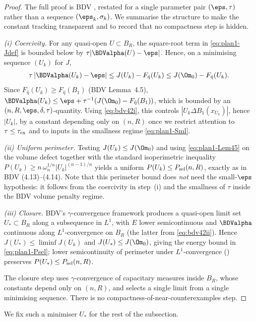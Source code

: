 \begin{proof}
The full proof is BDV \cite[Lemma~4.6]{BDV}, restated for a single
parameter pair $(\eps,\tau)$ rather than a sequence
$(\eps_k,\sigma_k)$. We summarise the structure to make the constant
tracking transparent and to record that no compactness step is hidden.

\emph{(i) Coercivity.} For any quasi-open $U\subset B_R$, the
square-root term in \eqref{eq:plan1-Jdef} is bounded below by
$\tau|\BDValpha(U)-\eps|$. Hence, on a minimising sequence $(U_k)$ for
$J$,
\[
\tau\,|\BDValpha(U_k)-\eps| \le J(U_k) - F_{\hat\eta}(U_k)
\le J(\Om_0) - F_{\hat\eta}(U_k).
\]
Since $F_{\hat\eta}(U_k)\ge F_{\hat\eta}(B_1)$ (BDV Lemma~4.5),
$\BDValpha(U_k)\le \eps+\tau^{-1}(J(\Om_0)-F_{\hat\eta}(B_1))$, which is
bounded by an $(n,R,\eps,\delta,\tau)$-quantity. Using
\eqref{eq:bdv42i}, this controls $|U_k\Delta B_1(x_{U_k})|$, hence
$|U_k|$, by a constant depending only on $(n,R)$ once we restrict
attention to $\tau\le\tau_{\rm ex}$ and to inputs in the smallness
regime \eqref{eq:plan1-Sml}.

\emph{(ii) Uniform perimeter.} Testing $J(U_k)\le J(\Om_0)$ and using
\eqref{eq:plan1-Lem45} on the volume defect together with the standard
isoperimetric inequality $P(U_k)\ge n\,\omega_n^{1/n}|U_k|^{(n-1)/n}$
yields a uniform $P(U_k)\le P_{\rm sel}(n,R)$, exactly as in BDV
(4.13)--(4.14). Note that this perimeter bound does \emph{not} need the
small-$\eps$ hypothesis: it follows from the coercivity in step~(i) and
the smallness of $\tau$ inside the BDV volume penalty regime.

\emph{(iii) Closure.} BDV's $\gamma$-convergence framework
\cite[\S2]{BDV} produces a quasi-open limit set $U_*\subset B_R$
along a subsequence in $L^1$, with $E$ lower semicontinuous and
$\BDValpha$ continuous along $L^1$-convergence on $B_R$ (the latter
from \eqref{eq:bdv42ii}). Hence $J(U_*)\le \liminf J(U_k)$ and
$J(U_*)\le J(\Om_0)$, giving the energy bound in \eqref{eq:plan1-Psel};
lower semicontinuity of perimeter under $L^1$-convergence
(\cite[Prop.~12.15]{Maggi2012}) preserves $P(U_*)\le P_{\rm sel}(n,R)$.

The closure step uses $\gamma$-convergence of capacitary measures
inside $B_R$, whose constants depend only on $(n,R)$, and selects a
single limit from a single minimising sequence. There is no
compactness-of-near-counterexamples step.
\end{proof}

We fix such a minimiser $U_*$ for the rest of the subsection.

